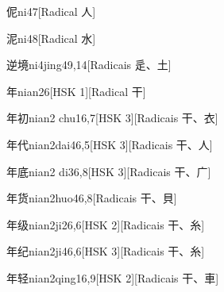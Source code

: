 \begin{entry}{伲}{ni4}{7}[Radical ⼈]
\end{entry}

\begin{entry}{泥}{ni4}{8}[Radical ⽔]
\end{entry}

\begin{entry}{逆境}{ni4jing4}{9,14}[Radicais ⾡、⼟]
\end{entry}

\begin{entry}{年}{nian2}{6}[HSK 1][Radical ⼲]
\end{entry}

\begin{entry}{年初}{nian2 chu1}{6,7}[HSK 3][Radicais ⼲、⾐]
\end{entry}

\begin{entry}{年代}{nian2dai4}{6,5}[HSK 3][Radicais ⼲、⼈]
\end{entry}

\begin{entry}{年底}{nian2 di3}{6,8}[HSK 3][Radicais ⼲、⼴]
\end{entry}

\begin{entry}{年货}{nian2huo4}{6,8}[Radicais ⼲、⾙]
\end{entry}

\begin{entry}{年级}{nian2ji2}{6,6}[HSK 2][Radicais ⼲、⽷]
\end{entry}

\begin{entry}{年纪}{nian2ji4}{6,6}[HSK 3][Radicais ⼲、⽷]
\end{entry}

\begin{entry}{年轻}{nian2qing1}{6,9}[HSK 2][Radicais ⼲、⾞]
\end{entry}

